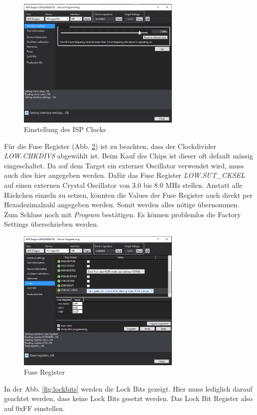 \begin{figure}[h]
\centering
\includegraphics[width=0.7\textwidth]{../../../graphics/device_programming/2.PNG}
\caption{Einstellung des ISP Clocks}
\label{fig:einstellung des ispclocks}
\end{figure}
Für die Fuse Register (Abb. \ref{fig:fuseregister}) ist zu beachten, dass der Clockdivider \textit{LOW.CHKDIV8} abgewählt ist. Beim Kauf des Chips ist dieser oft default mässig eingeschaltet. Da auf dem Target ein externer Oscillator verwendet wird, muss auch dies hier angegeben werden. Dafür das Fuse Register \textit{LOW.SUT_CKSEL} auf einen externen Crystal Oscillator von 3.0 bis 8.0 MHz stellen. Anstatt alle Häckchen einzeln zu setzen, könnten die Values der Fuse Register auch direkt per Hexadezimalzahl angegeben werden. Somit werden alles nötige übernommen. Zum Schluss noch mit \textit{Program} bestätigen. Es können problemlos die Factory Settings überschrieben werden.\\

\begin{figure}[h]
\centering
\includegraphics[width=0.7\textwidth]{../../../graphics/device_programming/3.PNG}
\caption{Fuse Register}
\label{fig:fuseregister}
\end{figure}
In der Abb. \ref{fig:lockbits} werden die Lock Bits gezeigt. Hier muss lediglich darauf geachtet werden, dass keine Lock Bits gesetzt werden. Das Lock Bit Register also auf 0xFF einstellen.\\

